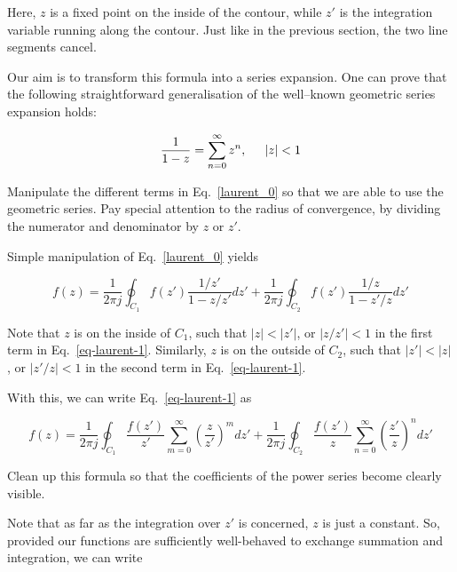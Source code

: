 Here, $z$ is a fixed point on the inside of the contour, while $z'$ is the integration variable running along the contour. Just like in the previous section, the two line segments cancel.

Our aim is to transform this formula into a series expansion. One can prove that the following straightforward generalisation of the well--known geometric series expansion holds:

\begin{equation}
\frac{1}{1-z} = \sum_{n=0}^\infty z^n, \hspace{.5cm} |z| < 1
\end{equation}

\begin{cue}
Manipulate the different terms in Eq.~\ref{laurent_0} so that we are able to use the geometric series. Pay special attention to the radius of convergence, by dividing the numerator and denominator by $z$ or $z'$.
\end{cue}

Simple manipulation of Eq.~\ref{laurent_0} yields

\begin{equation}
f(z)=\frac{1}{2 \pi j }\oint_{{C}_1} f(z') \frac{1 / z'} {1-z / z'} dz' + \frac{1}{2 \pi j }\oint_{{C}_2} f(z') \frac{1 / z} {1 - z' / z} dz'
\label{eq-laurent-1}
\end{equation} 

Note that $z$ is on the inside of ${C}_1$, such that $| z | < |z'| $, or $ |z / z' | < 1$ in the first term in Eq.~\ref{eq-laurent-1}. Similarly, $z$ is on the outside of ${C}_2$, such that $|z'| < | z | $, or $ |z'  / z| <
1$ in the second term in Eq.~\ref{eq-laurent-1}.

With this, we can write Eq.~\ref{eq-laurent-1} as

\begin{equation}
f(z)=\frac{1}{2 \pi j }\oint_{{C}_1} \frac{f(z')}{z'} \sum_{m=0}^{\infty} \left( \frac{z}{z'}\right)^m dz' + \frac{1}{2 \pi j }\oint_{{C}_2} \frac{f(z')}{z} \sum_{n=0}^{\infty} \left(\frac{z'}{z}\right)^n dz'
\end{equation}

\begin{cue}
Clean up this formula so that the coefficients of the power series become clearly visible.
\end{cue}

Note that as far as the integration over $z'$ is concerned, $z$ is just a constant. So, provided our functions are sufficiently well-behaved to exchange summation and integration, we can write

